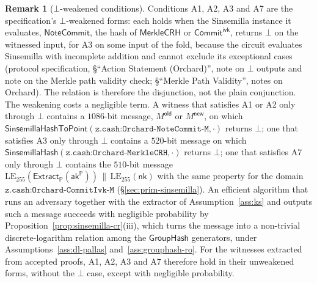 \documentclass[11pt,a4paper]{article}
\theoremstyle{definition}
\newtheorem{remark}[theorem]{Remark}
\newcommand{\PP}{\mathbb{P}}
\newcommand{\NoteCommit}{\ensuremath{\mathsf{NoteCommit}}}
\newcommand{\CommitIvk}{\ensuremath{\mathsf{Commit}^{\mathsf{ivk}}}}
\newcommand{\Extract}{\ensuremath{\mathsf{Extract}}}
\newcommand{\GroupHash}{\ensuremath{\mathsf{GroupHash}}}
\newcommand{\aksym}{\ensuremath{\mathsf{ak}}}
\newcommand{\nksym}{\ensuremath{\mathsf{nk}}}
\begin{document}
\begin{remark}[$\bot$-weakened conditions]
Conditions A1, A2, A3 and A7 are the specification's $\bot$-weakened forms:
each holds when the Sinsemilla instance it evaluates, $\NoteCommit$, the
hash of $\mathsf{MerkleCRH}$ or $\CommitIvk$, returns $\bot$ on the witnessed
input, for A3 on some input of the fold, because the circuit evaluates
Sinsemilla with incomplete addition and cannot exclude its exceptional
cases (protocol specification, \S``Action Statement (Orchard)'', note on
$\bot$ outputs and note on the Merkle path validity check; \S``Merkle Path
Validity'', notes on Orchard). The relation is therefore the
disjunction, not the plain conjunction. The weakening costs a negligible
term. A witness that satisfies A1 or A2 only through $\bot$ contains a
$1086$-bit message, $M^{\mathsf{old}}$ or $M^{\mathsf{new}}$, on which
$\mathsf{SinsemillaHashToPoint}(\texttt{z.cash:Orchard-NoteCommit-M},
\cdot)$ returns $\bot$; one that satisfies A3 only through $\bot$ contains a
$520$-bit message on which
$\mathsf{SinsemillaHash}(\texttt{z.cash:Orchard-MerkleCRH}, \cdot)$ returns
$\bot$; one that satisfies A7 only through $\bot$ contains the
$510$-bit message
$\mathrm{LE}_{255}(\Extract_{\PP}(\aksym^{\PP})) \,\|\,
\mathrm{LE}_{255}(\nksym)$ with the same property for the domain
$\texttt{z.cash:Orchard-CommitIvk-M}$ (\S\ref{sec:prim-sinsemilla}). An
efficient algorithm that runs an adversary together with the extractor of
Assumption~\ref{ass:ks} and outputs such a message succeeds with negligible
probability by Proposition~\ref{prop:sinsemilla-cr}(iii), which turns the
message into a non-trivial discrete-logarithm relation among the
$\GroupHash$ generators, under Assumptions~\ref{ass:dl-pallas}
and~\ref{ass:grouphash-ro}. For the witnesses extracted from accepted
proofs, A1, A2, A3 and A7 therefore hold in their unweakened forms, without
the $\bot$ case, except with negligible probability.
\end{remark}
\end{document}
